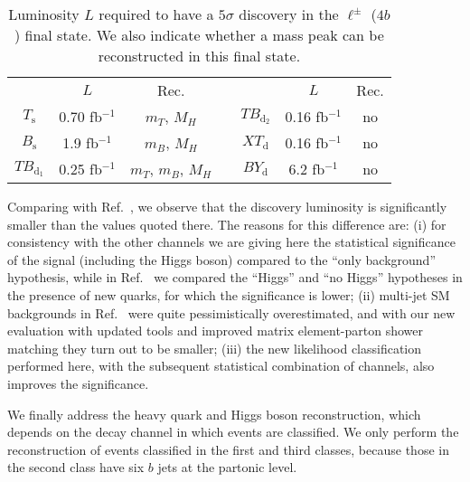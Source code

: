 \documentclass[12pt,a4paper]{article}
\newcommand{\fbin}{fb$^{-1}$}
\newcommand{\Ts}{T_\text{s}}
\newcommand{\Bs}{B_\text{s}}
\newcommand{\TBd}{TB_{\text{d}_1}}
\newcommand{\TBD}{TB_{\text{d}_2}}
\newcommand{\XTd}{XT_\text{d}}
\newcommand{\BYd}{BY_\text{d}}
\begin{document}
\begin{table}[t]
\begin{center}
\begin{tabular}{ccccccc}
       & $L$        & Rec. & \quad &        & $L$       & Rec. \\[1mm]
$\Ts$  & 0.70  \fbin & $m_T$, $M_H$   &       & $\TBD$ & 0.16 \fbin & no \\
$\Bs$  & 1.9  \fbin & $m_B$, $M_H$   &       & $\XTd$ & 0.16 \fbin & no \\
$\TBd$ & 0.25 \fbin & $m_T$, $m_B$, $M_H$   &       & $\BYd$ & 6.2 \fbin & no
\end{tabular}
\end{center}
\caption{Luminosity $L$ required to have a $5\sigma$ discovery in the $\ell^\pm $ ($4b$) final state.
We also indicate whether a mass peak can be reconstructed in this final state.}
\label{tab:sig-1Q1-4b}
\end{table}

Comparing with Ref.~\cite{AguilarSaavedra:2006gw}, we observe that the discovery luminosity is significantly smaller than the values quoted there. The reasons for this difference are: (i) for consistency with the other channels  we are giving here the statistical significance of the signal (including the Higgs boson) compared to the ``only background'' hypothesis, while in Ref.~\cite{AguilarSaavedra:2006gw} we compared the ``Higgs'' and ``no Higgs'' hypotheses in the presence of new quarks, for which the significance is lower; (ii) multi-jet SM backgrounds in Ref.~\cite{AguilarSaavedra:2006gw} were quite pessimistically overestimated, and with our new evaluation with updated tools and improved matrix element-parton shower matching they turn out to be smaller; (iii) the new likelihood classification performed here, with the subsequent statistical combination of channels, also improves the significance.

We finally address the heavy quark and Higgs boson reconstruction, which depends on the decay channel in which events are classified. We only perform the reconstruction of events classified in the first and third classes, because those in the second class have six $b$ jets at the partonic level.
\end{document}
